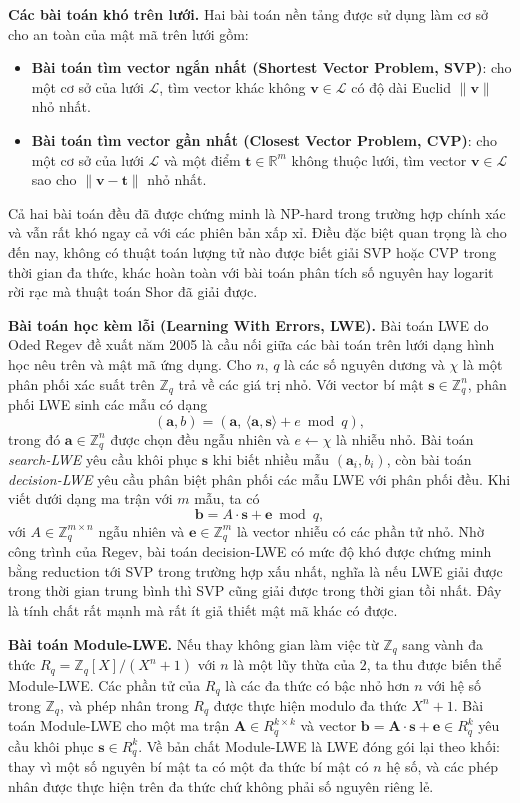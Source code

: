 \textbf{Các bài toán khó trên lưới.} Hai bài toán nền tảng được sử dụng làm cơ sở cho an toàn của mật mã trên lưới gồm:
\begin{itemize}
    \item \textbf{Bài toán tìm vector ngắn nhất (Shortest Vector Problem, SVP)}: cho một cơ sở của lưới $\mathcal{L}$, tìm vector khác không $\mathbf{v} \in \mathcal{L}$ có độ dài Euclid $\|\mathbf{v}\|$ nhỏ nhất.
    \item \textbf{Bài toán tìm vector gần nhất (Closest Vector Problem, CVP)}: cho một cơ sở của lưới $\mathcal{L}$ và một điểm $\mathbf{t} \in \mathbb{R}^m$ không thuộc lưới, tìm vector $\mathbf{v} \in \mathcal{L}$ sao cho $\|\mathbf{v} - \mathbf{t}\|$ nhỏ nhất.
\end{itemize}
Cả hai bài toán đều đã được chứng minh là NP-hard trong trường hợp chính xác và vẫn rất khó ngay cả với các phiên bản xấp xỉ. Điều đặc biệt quan trọng là cho đến nay, không có thuật toán lượng tử nào được biết giải SVP hoặc CVP trong thời gian đa thức, khác hoàn toàn với bài toán phân tích số nguyên hay logarit rời rạc mà thuật toán Shor đã giải được.

\textbf{Bài toán học kèm lỗi (Learning With Errors, LWE).} Bài toán LWE do Oded Regev đề xuất năm 2005 là cầu nối giữa các bài toán trên lưới dạng hình học nêu trên và mật mã ứng dụng. Cho $n$, $q$ là các số nguyên dương và $\chi$ là một phân phối xác suất trên $\mathbb{Z}_q$ trả về các giá trị nhỏ. Với vector bí mật $\mathbf{s} \in \mathbb{Z}_q^n$, phân phối LWE sinh các mẫu có dạng
\[
(\mathbf{a}, b) = \left(\mathbf{a}, \, \langle \mathbf{a}, \mathbf{s} \rangle + e \bmod q \right),
\]
trong đó $\mathbf{a} \in \mathbb{Z}_q^n$ được chọn đều ngẫu nhiên và $e \leftarrow \chi$ là nhiễu nhỏ. Bài toán \emph{search-LWE} yêu cầu khôi phục $\mathbf{s}$ khi biết nhiều mẫu $(\mathbf{a}_i, b_i)$, còn bài toán \emph{decision-LWE} yêu cầu phân biệt phân phối các mẫu LWE với phân phối đều. Khi viết dưới dạng ma trận với $m$ mẫu, ta có
\[
\mathbf{b} = A \cdot \mathbf{s} + \mathbf{e} \bmod q,
\]
với $A \in \mathbb{Z}_q^{m \times n}$ ngẫu nhiên và $\mathbf{e} \in \mathbb{Z}_q^m$ là vector nhiễu có các phần tử nhỏ. Nhờ công trình của Regev, bài toán decision-LWE có mức độ khó được chứng minh bằng reduction tới SVP trong trường hợp xấu nhất, nghĩa là nếu LWE giải được trong thời gian trung bình thì SVP cũng giải được trong thời gian tồi nhất. Đây là tính chất rất mạnh mà rất ít giả thiết mật mã khác có được.

\textbf{Bài toán Module-LWE.} Nếu thay không gian làm việc từ $\mathbb{Z}_q$ sang vành đa thức $R_q = \mathbb{Z}_q[X] / (X^n + 1)$ với $n$ là một lũy thừa của $2$, ta thu được biến thể Module-LWE. Các phần tử của $R_q$ là các đa thức có bậc nhỏ hơn $n$ với hệ số trong $\mathbb{Z}_q$, và phép nhân trong $R_q$ được thực hiện modulo đa thức $X^n + 1$. Bài toán Module-LWE cho một ma trận $\mathbf{A} \in R_q^{k \times k}$ và vector $\mathbf{b} = \mathbf{A} \cdot \mathbf{s} + \mathbf{e} \in R_q^k$ yêu cầu khôi phục $\mathbf{s} \in R_q^k$. Về bản chất Module-LWE là LWE đóng gói lại theo khối: thay vì một số nguyên bí mật ta có một đa thức bí mật có $n$ hệ số, và các phép nhân được thực hiện trên đa thức chứ không phải số nguyên riêng lẻ.

